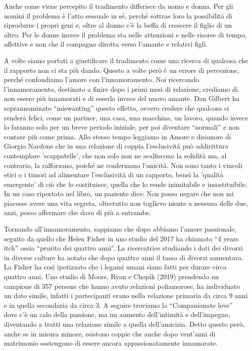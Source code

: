 \documentclass[12pt]{book} %
\begin{document}
Anche come viene percepito il tradimento differisce da uomo e donna. Per gli uomini il problema è
l'atto sessuale in sé, perché sottrae loro la possibilità di riprodurre i propri geni e, oltre al
danno c'è la beffa di crescere il figlio di un altro. Per le donne invece il problema sta nelle
attenzioni e nelle risorse di tempo, affettive e non che il compagno dirotta verso l'amante e
relativi figli. 

A volte siamo portati a giustificare il tradimento come una ricerca di qualcosa che il rapporto non ci sta più dando.
Questo a volte però è un errore di percezione, perché confondiamo l'amore con
l'innamoramento. Noi ricercando l'innamoramento, destinato a finire dopo i
primi mesi di relazione, crediamo di non essere più innamorati e di esserlo invece del nuovo amante. 
Dan Gilbert ha soprannominato “miswanting” questo effetto, ovvero credere che qualcosa ci renderà felici, come un partner,
una casa, una macchina, un lavoro, quando invece lo faranno solo per un breve periodo iniziale, per poi
diventare “normali” e non contare più come prima. 
Allo stesso tempo leggiamo in Amore e disamore di Giorgio Nardone che
in una relazione di coppia l'esclusività può addirittura contemplare
'scappatelle', che non solo non ne scalfiscono la solidità ma, al contrario,
la rafforzano, poiché ne confermano l'unicità.
Non sono tanto i vincoli etici o i timori ad alimentare l'esclusività di un rapporto, bensì la
'qualità emergente' di ciò che lo costituisce, quella che lo rende
inimitabile e insostituibile. In un caso riportato nel libro, un paziente dice: Non posso negare che non mi piacesse
avere una vita segreta, oltretutto non toglievo niente a nessuna delle due, anzi, posso affermare che davo di più a entrambe.

Tornando all'innamoramento, sappiamo che dopo abbiamo l'amore passionale, seguito da quello che
Helen Fisher in uno studio del 2017 ha chiamato “4 years itch” ossia “prurito dei quattro anni”. La ricercatrice
studiando i dati dei divorzi in diverse culture ha notato che dopo quattro anni il tasso di divorzi aumentava. La
Fisher ha così ipotizzato che i legami umani siano fatti per durare circa quattro anni. Uno studio
di Moors, Ryan e Chopik (2019) prendendo un campione di 357 persone che hanno avuto relazioni poliamorose, ha
individuato un dato simile, infatti i partecipanti erano nella relazione primaria da circa 9 anni e in quella
secondaria da circa 3. A seguire troviamo la “Companionate love” dove c'è un calo della passione,
ma un aumento dell'intimità e dell'impegno, diventando a tratti una relazione
simile a quella dell'amicizia. Detto questo però, anche se in misura minore, esistono
coppie che anche dopo vent'anni di matrimonio sostengono di essere ancora appassionatamente
innamorate. 
\end{document}
